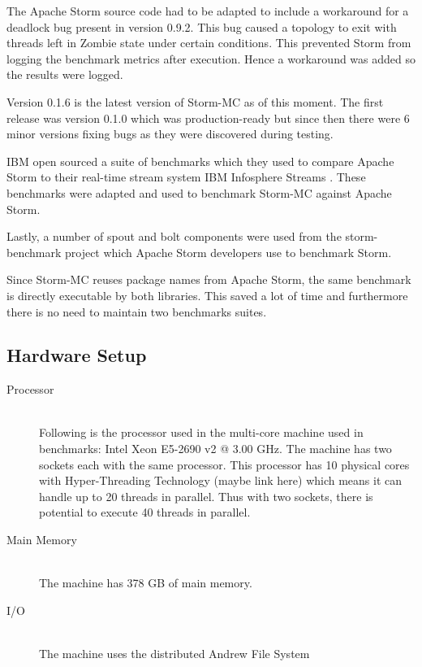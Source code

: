 The Apache Storm source code had to be adapted to include a workaround for a deadlock bug present in version 0.9.2. This bug caused a topology to exit with threads left in Zombie state under certain conditions. This prevented Storm from logging the benchmark metrics after execution. Hence a workaround was added so the results were logged.

Version 0.1.6 is the latest version of Storm-MC as of this moment. The first release was version 0.1.0 which was production-ready but since then there were 6 minor versions fixing bugs as they were discovered during testing.

IBM open sourced a suite of benchmarks which they used to compare Apache Storm to their real-time stream system IBM Infosphere Streams \citep{InfoSphereStreams}. These benchmarks were adapted and used to benchmark Storm-MC against Apache Storm.

Lastly, a number of spout and bolt components were used from the storm-benchmark project which Apache Storm developers use to benchmark Storm.

Since Storm-MC reuses package names from Apache Storm, the same benchmark is directly executable by both libraries. This saved a lot of time and furthermore there is no need to maintain two benchmarks suites.


\subsection{Hardware Setup}

\begin{description}
	\item[Processor] \hfill \\
	Following is the processor used in the multi-core machine used in benchmarks: Intel\textsuperscript{\textregistered} Xeon\textsuperscript{\textregistered} E5-2690 v2 @ 3.00 GHz. The machine has two sockets each with the same processor. This processor has 10 physical cores with Hyper-Threading Technology (maybe link here) which means it can handle up to 20 threads in parallel. Thus with two sockets, there is potential to execute 40 threads in parallel.
	\item[Main Memory] \hfill \\
	The machine has 378 GB of main memory.
	\item[I/O] \hfill \\
	The machine uses the distributed Andrew File System
\end{description}


